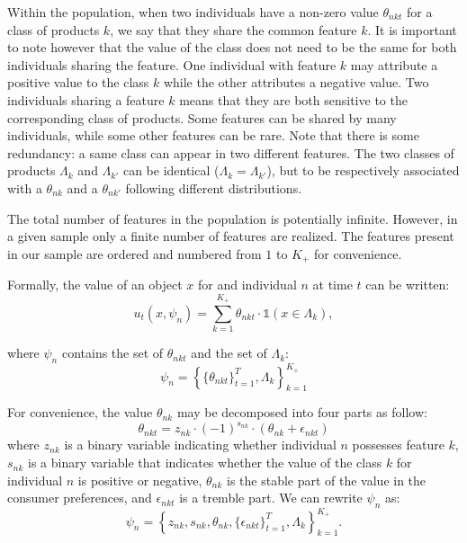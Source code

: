 \documentclass[12pt]{article}
\begin{document}
Within the population, when two individuals have a non-zero value $\theta_{nkt}$ for a class of products $k$, we say that they share the common feature $k$. It is important to note however that the value of the class does not need to be the same for both individuals sharing the feature. One individual with feature $k$ may attribute a positive value to the class $k$ while the other attributes a negative value. Two individuals sharing a feature $k$ means that they are both sensitive to the corresponding class of products. Some features can be shared by many individuals, while some other features can be rare. 
Note that there is some redundancy: a same class can appear in two different features. The two classes of products $\Lambda_k$ and $\Lambda_{k'}$ can be identical ($\Lambda_k = \Lambda_{k'}$), but to be respectively associated with a $\theta_{nk}$ and a $\theta_{nk'}$ following different distributions.

The total number of features in the population is potentially infinite. However, in a given sample only a finite number of features are realized. The features present in our sample are ordered and numbered from $1$ to $K_+$ for convenience.

Formally, the value of an object $x$ for and individual $n$ at time $t$ can be written:
\begin{equation}\label{e:uff}
	u_t(x,\psi_n) = \sum_{k=1}^{K_+} \theta_{nkt} \cdot \mathds{1}(x \in \Lambda_k),
\end{equation}

where $\psi_n$ contains the set of $\theta_{nkt}$ and the set of $\Lambda_k$:
$$ \psi_n = \left\{ \{\theta_{nkt}\}_{t=1}^T , \Lambda_{k} \right\}_{k=1}^{K_+} $$

For convenience, the value $\theta_{nk}$ may be decomposed into four parts as follow:
$$ \theta_{nkt} = z_{nk} \cdot (-1)^{s_{nk}} \cdot (\theta_{nk} + \epsilon_{nkt}) $$
where $z_{nk}$ is a binary variable indicating whether individual $n$ possesses feature $k$, $s_{nk}$ is a binary variable that indicates whether the value of the class $k$ for individual $n$ is positive or negative, $\theta_{nk}$ is the stable part of the value in the consumer preferences, and $\epsilon_{nkt}$ is a tremble part. We can rewrite $\psi_n$ as:
$$ \psi_n = \left\{ z_{nk}, s_{nk},\theta_{nk}, \{\epsilon_{nkt}\}_{t=1}^T , \Lambda_{k} \right\}_{k=1}^{K_+} .$$
\end{document}
